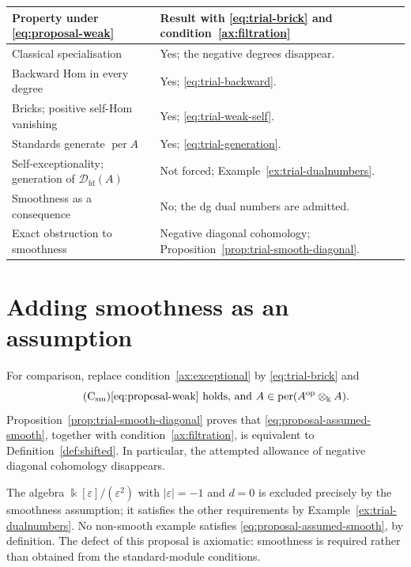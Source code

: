 \documentclass[11pt,a4paper]{article}
\newcommand{\D}{\mathcal D}
\newcommand{\op}{\mathrm{op}}
\DeclareMathOperator{\fd}{fd}
\DeclareMathOperator{\per}{per}
\theoremstyle{plain}
\theoremstyle{definition}
\numberwithin{equation}{section}
\begin{document}
\begin{center}\small
\begin{tabularx}{\linewidth}{@{}>{\raggedright\arraybackslash}p{.36\linewidth}>{\raggedright\arraybackslash}X@{}}
\toprule
Property under \eqref{eq:proposal-weak} & Result with
\eqref{eq:trial-brick} and condition~\ref{ax:filtration} \\\midrule
Classical specialisation & Yes; the negative degrees disappear.\\
Backward Hom in every degree & Yes; \eqref{eq:trial-backward}.\\
Bricks; positive self-Hom vanishing & Yes; \eqref{eq:trial-weak-self}.\\
Standards generate $\per A$ & Yes; \eqref{eq:trial-generation}.\\
Self-exceptionality; generation of $\D_{\fd}(A)$ & Not forced;
Example~\ref{ex:trial-dualnumbers}.\\
Smoothness as a consequence & No; the dg dual numbers are admitted.\\
Exact obstruction to smoothness & Negative diagonal cohomology;
Proposition~\ref{prop:trial-smooth-diagonal}.\\
\bottomrule
\end{tabularx}
\end{center}

\section{Adding smoothness as an assumption}
\label{sec:proposal-assumed-smooth}

For comparison, replace condition~\ref{ax:exceptional} by
\eqref{eq:trial-brick} and
\begin{equation*}\tag{C${}_{\mathrm{sm}}$}\label{eq:proposal-assumed-smooth}
 \text{\eqref{eq:proposal-weak} holds, and }
 A\in\per(A^{\op}\otimes_{\Bbbk}A).
\end{equation*}
Proposition~\ref{prop:trial-smooth-diagonal} proves that
\eqref{eq:proposal-assumed-smooth}, together with
condition~\ref{ax:filtration}, is equivalent to
Definition~\ref{def:shifted}. In particular, the attempted allowance
of negative diagonal cohomology disappears.

The algebra $\Bbbk[\varepsilon]/(\varepsilon^2)$ with
$|\varepsilon|=-1$ and $d=0$ is excluded precisely by the smoothness
assumption; it satisfies the other requirements by
Example~\ref{ex:trial-dualnumbers}. No non-smooth example satisfies
\eqref{eq:proposal-assumed-smooth}, by definition. The defect of this
proposal is axiomatic: smoothness is required rather than obtained
from the standard-module conditions.
\end{document}

